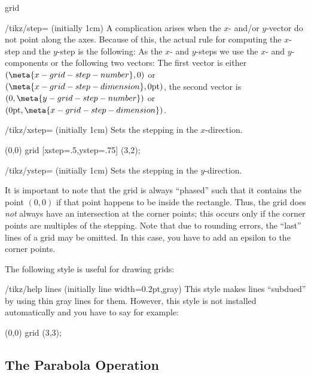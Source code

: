 \begin{pathoperation}{grid}{}
\begin{key}{/tikz/step=
    (initially 1cm)}
  A complication arises when the $x$- and/or $y$-vector do not point
  along the axes. Because of this, the actual rule for computing the
  $x$-step and the $y$-step is the following: As the $x$- and
  $y$-steps we use the $x$- and $y$-components or the following two
  vectors: The first vector is either $(\meta{x-grid-step-number},0)$
  or $(\meta{x-grid-step-dimension},0\mathrm{pt})$, the second vector
  is  $(0,\meta{y-grid-step-number})$ or
  $(0\mathrm{pt},\meta{x-grid-step-dimension})$.
\end{key}

\begin{key}{/tikz/xstep= (initially 1cm)}
  Sets the stepping in the $x$-direction.
\begin{codeexample}[]
\tikz \draw (0,0) grid [xstep=.5,ystep=.75] (3,2);
\end{codeexample}
\end{key}

\begin{key}{/tikz/ystep= (initially 1cm)}
  Sets the stepping in the $y$-direction.
\end{key}

  It is important to note that the grid is always ``phased'' such that
  it contains the point $(0,0)$ if that point happens to be inside the
  rectangle. Thus, the grid does \emph{not} always have an intersection
  at the corner points; this occurs only if the corner points are
  multiples of the stepping. Note that due to rounding errors, the
  ``last'' lines of a grid may be omitted. In this case, you have to
  add an epsilon to the corner points.

  The following style is useful for drawing grids:
\begin{stylekey}{/tikz/help lines (initially {line width=0.2pt,gray})}
  This style makes lines ``subdued'' by using thin gray lines for
  them. However, this style is not installed automatically and you
  have to say for example:
\begin{codeexample}[]
\tikz {} (0,0) grid (3,3);
\end{codeexample}
\end{stylekey}

\end{pathoperation}



\subsection{The Parabola Operation}

